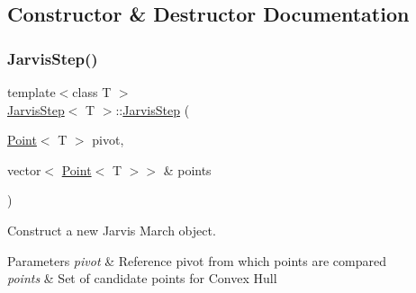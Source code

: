 \subsection{Constructor \& Destructor Documentation}
\mbox{\label{classJarvisStep_a92ed989e83f65b0ddeb17b2f4b278f2a}} 
\subsubsection{\texorpdfstring{Jarvis\+Step()}{JarvisStep()}}
{\footnotesize\ttfamily template$<$class T $>$ \\
\mbox{\hyperlink{classJarvisStep}{Jarvis\+Step}}$<$ T $>$\+::\mbox{\hyperlink{classJarvisStep}{Jarvis\+Step}} (\begin{DoxyParamCaption}\item[{\mbox{\hyperlink{classPoint}{Point}}$<$ T $>$}]{pivot,  }\item[{vector$<$ \mbox{\hyperlink{classPoint}{Point}}$<$ T $>$$>$ \&}]{points }\end{DoxyParamCaption})}



Construct a new Jarvis March object. 


\begin{DoxyParams}{Parameters}
{\em pivot} & Reference pivot from which points are compared \\
\hline
{\em points} & Set of candidate points for Convex Hull \\
\hline
\end{DoxyParams}

